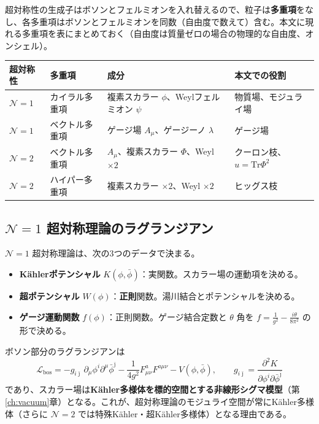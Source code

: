 \documentclass[uplatex, dvipdfmx, book]{jsbook}
\let\origsubsection\subsection
\let\origsubsubsection\subsubsection
\renewcommand{\section}{\origsubsection}
\renewcommand{\subsection}{\origsubsubsection}
\renewcommand{\subsubsection}{\paragraph}
\begin{document}
超対称性の生成子はボソンとフェルミオンを入れ替えるので、粒子は\textbf{多重項}をなし、各多重項はボソンとフェルミオンを同数（自由度で数えて）含む。本文に現れる多重項を表にまとめておく（自由度は質量ゼロの場合の物理的な自由度、オンシェル）。

\begin{center}\small\setlength{\tabcolsep}{4pt}
\begin{tabular}{llll}
    \hline
    超対称性 & 多重項 & 成分 & 本文での役割 \\
    \hline
    $\mathcal{N} = 1$ & カイラル多重項 & 複素スカラー $\phi$、Weylフェルミオン $\psi$ & 物質場、モジュライ場 \\
    $\mathcal{N} = 1$ & ベクトル多重項 & ゲージ場 $A_\mu$、ゲージーノ $\lambda$ & ゲージ場 \\
    $\mathcal{N} = 2$ & ベクトル多重項 & $A_\mu$、複素スカラー $\Phi$、Weyl $\times 2$ & クーロン枝、$u = \mathrm{Tr}\Phi^2$ \\
    $\mathcal{N} = 2$ & ハイパー多重項 & 複素スカラー $\times 2$、Weyl $\times 2$ & ヒッグス枝 \\
    \hline
\end{tabular}
\end{center}

\section{$\mathcal{N} = 1$ 超対称理論のラグランジアン}

$\mathcal{N} = 1$ 超対称理論は、次の3つのデータで決まる。
\begin{itemize}
    \item \textbf{K\"ahlerポテンシャル} $K(\phi, \bar\phi)$：実関数。スカラー場の運動項を決める。
    \item \textbf{超ポテンシャル} $W(\phi)$：\textbf{正則}関数。湯川結合とポテンシャルを決める。
    \item \textbf{ゲージ運動関数} $f(\phi)$：正則関数。ゲージ結合定数と $\theta$ 角を $f = \frac{1}{g^2} - \frac{i\theta}{8\pi^2}$ の形で決める。
\end{itemize}
ボソン部分のラグランジアンは
\begin{equation}
    \mathcal{L}_{\text{bos}} = -g_{i\bar\jmath}\,\partial_\mu\phi^i \partial^\mu\bar\phi^{\bar\jmath} - \frac{1}{4g^2}F^a_{\mu\nu}F^{a\mu\nu} - V(\phi, \bar\phi), \qquad g_{i\bar\jmath} = \frac{\partial^2 K}{\partial\phi^i\partial\bar\phi^{\bar\jmath}}
\end{equation}
であり、スカラー場は\textbf{K\"ahler多様体を標的空間とする非線形シグマ模型}（第\ref{ch:vacuum}章）となる。これが、超対称理論のモジュライ空間が常にK\"ahler多様体（さらに $\mathcal{N} = 2$ では特殊K\"ahler・超K\"ahler多様体）となる理由である。
\end{document}
